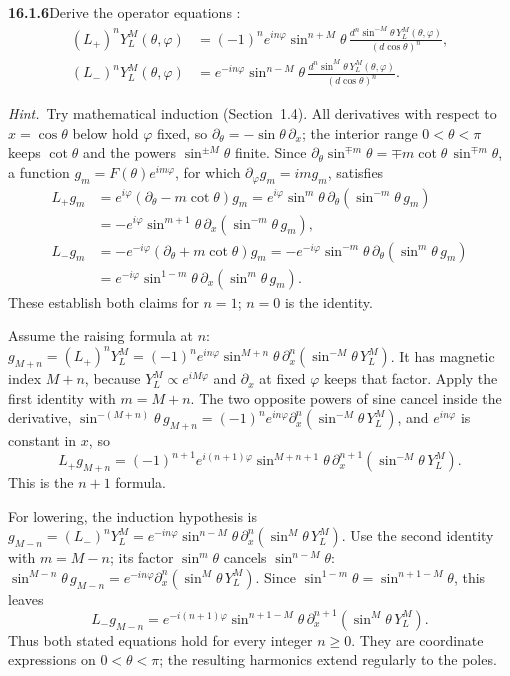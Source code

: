 \par\bigskip
\noindent\textbf{16.1.6}\quad Derive the operator equations
:
\begin{align*}
(L_{+})^{n}Y_{L}^{M}(\theta,\varphi)
&=(-1)^{n}e^{in\varphi}\sin^{n+M}\theta\,
\frac{d^{n}\sin^{-M}\theta\,Y_{L}^{M}(\theta,\varphi)}
{(d\cos\theta)^{n}},\\
(L_{-})^{n}Y_{L}^{M}(\theta,\varphi)
&=e^{-in\varphi}\sin^{n-M}\theta\,
\frac{d^{n}\sin^{M}\theta\,Y_{L}^{M}(\theta,\varphi)}
{(d\cos\theta)^{n}}.
\end{align*}
\par\emph{Hint.}~Try mathematical induction (Section~1.4).
\solution
All derivatives with respect to $x=\cos\theta$ below hold $\varphi$
fixed, so $\partial_\theta=-\sin\theta\,\partial_x$; the interior
range $0<\theta<\pi$ keeps $\cot\theta$ and the powers
$\sin^{\pm M}\theta$ finite. Since
$\partial_\theta\sin^{\mp m}\theta=\mp m\cot\theta\,\sin^{\mp m}\theta$,
a function $g_m=F(\theta)e^{im\varphi}$, for which
$\partial_\varphi g_m=img_m$, satisfies
\[
\begin{aligned}
L_+g_m
&=e^{i\varphi}(\partial_\theta-m\cot\theta)g_m
=e^{i\varphi}\sin^m\theta\,
\partial_\theta(\sin^{-m}\theta\,g_m)\\
&=-e^{i\varphi}\sin^{m+1}\theta\,
\partial_x(\sin^{-m}\theta\,g_m),\\
L_-g_m
&=-e^{-i\varphi}(\partial_\theta+m\cot\theta)g_m
=-e^{-i\varphi}\sin^{-m}\theta\,
\partial_\theta(\sin^m\theta\,g_m)\\
&=e^{-i\varphi}\sin^{1-m}\theta\,
\partial_x(\sin^m\theta\,g_m).
\end{aligned}
\]
These establish both claims for $n=1$; $n=0$ is the identity.

Assume the raising formula at $n$:
$g_{M+n}=(L_+)^nY_L^M=(-1)^ne^{in\varphi}\sin^{M+n}\theta
\,\partial_x^n(\sin^{-M}\theta\,Y_L^M)$.
It has magnetic index $M+n$, because $Y_L^M\propto e^{iM\varphi}$ and
$\partial_x$ at fixed $\varphi$ keeps that factor. Apply the first
identity with $m=M+n$. The two opposite powers of sine cancel inside
the derivative,
$\sin^{-(M+n)}\theta\,g_{M+n}
=(-1)^ne^{in\varphi}\partial_x^n(\sin^{-M}\theta\,Y_L^M)$,
and $e^{in\varphi}$ is constant in $x$, so
\[
L_+g_{M+n}
=(-1)^{n+1}e^{i(n+1)\varphi}\sin^{M+n+1}\theta\,
\partial_x^{n+1}(\sin^{-M}\theta\,Y_L^M).
\]
This is the $n+1$ formula.

For lowering, the induction hypothesis is
$g_{M-n}=(L_-)^nY_L^M=e^{-in\varphi}\sin^{n-M}\theta
\,\partial_x^n(\sin^M\theta\,Y_L^M)$.
Use the second identity with $m=M-n$; its factor
$\sin^m\theta$ cancels $\sin^{n-M}\theta$:
$\sin^{M-n}\theta\,g_{M-n}
=e^{-in\varphi}\partial_x^n(\sin^M\theta\,Y_L^M)$. Since
$\sin^{1-m}\theta=\sin^{n+1-M}\theta$, this leaves
\[
L_-g_{M-n}
=e^{-i(n+1)\varphi}\sin^{n+1-M}\theta\,
\partial_x^{n+1}(\sin^M\theta\,Y_L^M).
\]
Thus both stated equations hold for every integer $n\ge0$.
They are coordinate expressions on $0<\theta<\pi$; the resulting
harmonics extend regularly to the poles.

